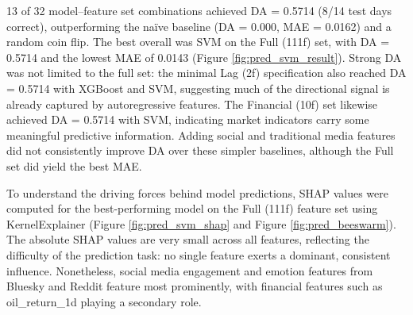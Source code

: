 13 of 32 model--feature set combinations achieved DA = 0.5714 (8/14 test days correct), outperforming the naïve baseline (DA = 0.000, MAE = 0.0162) and a random coin flip. The best overall was SVM on the Full (111f) set, with DA = 0.5714 and the lowest MAE of 0.0143 (Figure \ref{fig:pred_svm_result}). Strong DA was not limited to the full set: the minimal Lag (2f) specification also reached DA = 0.5714 with XGBoost and SVM, suggesting much of the directional signal is already captured by autoregressive features. The Financial (10f) set likewise achieved DA = 0.5714 with SVM, indicating market indicators carry some meaningful predictive information. Adding social and traditional media features did not consistently improve DA over these simpler baselines, although the Full set did yield the best MAE.

To understand the driving forces behind model predictions, SHAP values were computed for the best-performing model on the Full (111f) feature set using KernelExplainer (Figure \ref{fig:pred_svm_shap} and Figure \ref{fig:pred_beeswarm}). The absolute SHAP values are very small across all features, reflecting the difficulty of the prediction task: no single feature exerts a dominant, consistent influence. Nonetheless, social media engagement and emotion features from Bluesky and Reddit feature most prominently, with financial features such as oil\_return\_1d playing a secondary role.

